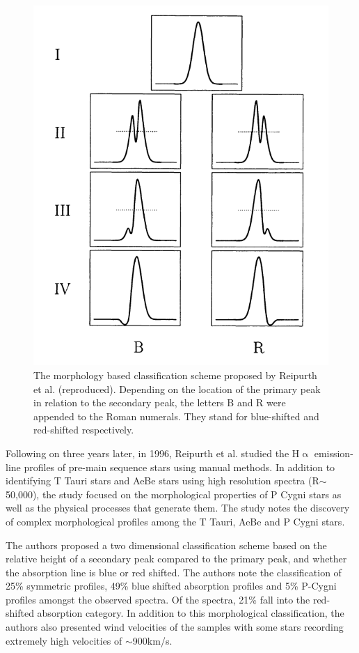 \begin{figure}[!htb]
\centering
\includegraphics[scale=1]{figures/reipurth classes.png}
\caption{The morphology based classification scheme proposed by Reipurth et al. (reproduced). Depending on the location of the primary peak in relation to the secondary peak, the letters B and R were appended to the Roman numerals. They stand for blue-shifted and red-shifted respectively.}
\end{figure}

Following on three years later, in 1996, Reipurth et al. studied the H$\upalpha$ emission-line profiles of pre-main sequence stars using manual methods. In addition to identifying T Tauri stars and AeBe stars using high resolution spectra (R$\sim$50,000), the study focused on the morphological properties of P Cygni stars as well as the physical processes that generate them. The study notes the discovery of complex morphological profiles among the T Tauri, AeBe and P Cygni stars. 

The authors proposed a two dimensional classification scheme based on the relative height of a secondary peak compared to the primary peak, and whether the absorption line is blue or red shifted. The authors note the classification of 25\% symmetric profiles, 49\% blue shifted absorption profiles and 5\% P-Cygni profiles amongst the observed spectra. Of the spectra, 21\% fall into the red-shifted absorption category. In addition to this morphological classification, the authors also presented wind velocities of the samples with some stars recording extremely high velocities of $\sim$900km/s\cite{reipurth1996halpha}. 

